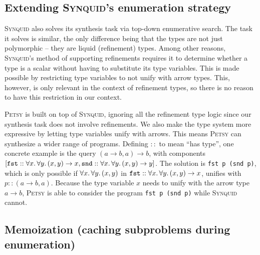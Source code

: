 \documentclass[acmsmall,nonacm]{acmart}
\begin{document}
\subsection{Extending \textsc{Synquid}'s enumeration strategy} 
\label{synquid_explanation}

\textsc{Synquid} also solves its synthesis task via top-down enumerative search.
The task it solves is similar, the only difference being that the types are
not just polymorphic -- they are liquid (refinement) types. Among other
reasons, \textsc{Synquid}'s method of supporting refinements requires it to
determine whether a type is a scalar without having to substitute its type
variables. This is made possible by restricting type variables to not unify
with arrow types. This, however, is only relevant in the context of refinement types, 
so there is no reason to have this restriction in our context. 


\textsc{Petsy} is built on top of \textsc{Synquid}, ignoring all the refinement
type logic since our synthesis task does not involve refinements. We also
make the type system more expressive by letting type variables unify with arrows.
This means \textsc{Petsy} can synthesize a wider range of programs.
Defining $::$ to mean ``has type'', one
concrete example is the query $(a \to b, a) \to b$, with components
$[\texttt{fst} :: \forall x\ldotp\forall y\ldotp (x,y)\to x, \texttt{snd} :: 
\forall x\ldotp\forall y\ldotp (x,y)\to y]$. The solution is \texttt{fst p
(snd p)}, which is only possible if $\forall x\ldotp\forall y\ldotp (x,y)$ in
$\texttt{fst} :: \forall x\ldotp\forall y\ldotp (x,y)\to x$,
unifies with $p :: (a \to b, a)$. Because the type variable $x$ needs to unify
with the arrow type $a \to b$, \textsc{Petsy} is able to consider the program
\texttt{fst p (snd p)} while \textsc{Synquid} cannot.

\subsection{Memoization (caching subproblems during enumeration)}
\end{document}

